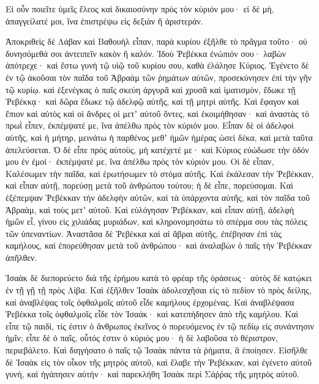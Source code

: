 {Εἰ οὖν ποιεῖτε ὑμεῖς ἔλεος καὶ δικαιοσύνην πρὸς τὸν κύριόν μου· εἰ δὲ μὴ, ἀπαγγείλατέ μοι, ἵνα ἐπιστρέψω εἰς δεξιὰν ἤ ἀριστεράν.
\par }{\PP {}Ἀποκριθεὶς δὲ Λάβαν καὶ Βαθουὴλ εἶπαν, παρὰ κυρίου ἐξῆλθε τὸ πρᾶγμα τοῦτο· οὐ δυνησόμεθά σοι ἀντειπεῖν κακὸν ἢ καλόν.
Ἰδοὺ Ῥεβέκκα ἐνώπιόν σου· λαβὼν ἀπότρεχε· καὶ ἔστω γυνὴ τῷ υἱῷ τοῦ κυρίου σου, καθὰ ἐλάλησε Κύριος.
Ἐγένετο δὲ ἐν τῷ ἀκοῦσαι τὸν παῖδα τοῦ Ἁβραὰμ τῶν ῥημάτων αὐτῶν, προσεκύνησεν ἐπὶ τὴν γῆν τῷ κυρίῳ.
καὶ ἐξενέγκας ὁ παῖς σκεύη ἀργυρᾶ καὶ χρυσᾶ καὶ ἱματισμὸν, ἔδωκε τῇ Ῥεβέκκᾳ· καὶ δῶρα ἔδωκε τῷ ἀδελφῷ αὐτῆς, καὶ τῇ μητρὶ αὐτῆς.
Καὶ ἔφαγον καὶ ἔπιον καὶ αὐτὸς καὶ οἱ ἄνδρες οἱ μετʼ αὐτοῦ ὄντες, καὶ ἐκοιμήθησαν· καὶ ἀναστὰς τὸ πρωῒ εἶπεν, ἐκπέμψατέ με, ἵνα ἀπέλθω πρὸς τὸν κύριόν μου.
Εἶπαν δὲ οἱ ἀδελφοὶ αὐτῆς, καὶ ἡ μήτηρ, μεινάτω ἡ παρθένος μεθʼ ἡμῶν ἡμέρας ὡσεὶ δέκα, καὶ μετὰ ταῦτα ἀπελεύσεται.
Ὁ δὲ εἶπε πρὸς αὐτοὺς, μὴ κατέχετέ με· καὶ Κύριος εὐώδωσε τὴν ὁδόν μου ἐν ἐμοί· ἐκπέμψατέ με, ἵνα ἀπέλθω πρὸς τὸν κύριόν μου.
Οἱ δὲ εἶπαν, Καλέσωμεν τὴν παῖδα, καὶ ἐρωτήσωμεν τὸ στόμα αὐτῆς.
Καὶ ἐκάλεσαν τὴν Ῥεβέκκαν, καὶ εἶπαν αὐτῇ, πορεύσῃ μετὰ τοῦ ἀνθρώπου τούτου; ἡ δὲ εἶπε, πορεύσομαι.
Καὶ ἐξέπεμψαν Ῥεβέκκαν τὴν ἀδελφὴν αὐτῶν, καὶ τὰ ὑπάρχοντα αὐτῆς, καὶ τὸν παῖδα τοῦ Ἁβραὰμ, καὶ τοὺς μετʼ αὐτοῦ.
Καὶ εὐλόγησαν Ῥεβέκκαν, καὶ εἶπαν αὐτῇ, ἀδελφὴ ἡμῶν εἶ, γίνου εἰς χιλιάδας μυριάδων, καὶ κληρονομησάτω τὸ σπέρμα σου τὰς πόλεις τῶν ὑπεναντίων.
Ἀναστᾶσα δὲ Ῥεβέκκα καὶ αἱ ἅβραι αὐτῆς, ἐπέβησαν ἐπὶ τὰς καμήλους, καὶ ἐπορεύθησαν μετὰ τοῦ ἀνθρώπου· καὶ ἀναλαβὼν ὁ παῖς τὴν Ῥεβέκκαν ἀπῆλθεν.
\par }{\PP {}Ἰσαὰκ δὲ διεπορεύετο διὰ τῆς ἐρήμου κατὰ τὸ φρέαρ τῆς ὁράσεως· αὐτὸς δὲ κατῴκει ἐν τῇ γῇ τῇ πρὸς Λίβα.
Καὶ ἐξῆλθεν Ἰσαὰκ ἀδολεσχῆσαι εἰς τὸ πεδίον τὸ πρὸς δείλης, καὶ ἀναβλέψας τοῖς ὀφθαλμοῖς αὐτοῦ εἶδε καμήλους ἐρχομένας.
Καὶ ἀναβλέψασα Ῥεβέκκα τοῖς ὀφθαλμοῖς εἶδε τὸν Ἰσαάκ· καὶ κατεπήδησεν ἀπὸ τῆς καμήλου.
Καὶ εἶπε τῷ παιδὶ, τίς ἐστιν ὁ ἄνθρωπος ἐκεῖνος ὁ πορευόμενος ἐν τῷ πεδίῳ εἰς συνάντησιν ἡμῖν; εἶπε δὲ ὁ παῖς, οὗτός ἐστιν ὁ κύριός μου· ἡ δὲ λαβοῦσα τὸ θέριστρον, περιεβάλετο.
Καὶ διηγήσατο ὁ παῖς τῷ Ἰσαὰκ πάντα τὰ ῥήματα, ἃ ἐποίησεν.
Εἰσῆλθε δὲ Ἰσαὰκ εἰς τὸν οἶκον τῆς μητρὸς αὐτοῦ, καὶ ἔλαβε τὴν Ῥεβέκκαν, καὶ ἐγένετο αὐτοῦ γυνὴ, καὶ ἠγάπησεν αὐτήν· καὶ παρεκλήθη Ἰσαὰκ περὶ Σάῤῥας τῆς μητρὸς αὐτοῦ.

}

